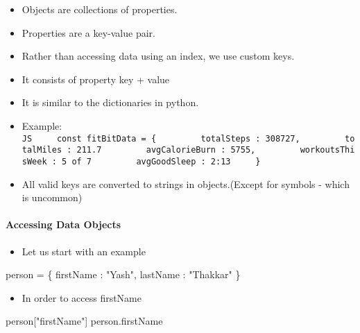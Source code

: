 \documentclass[
  paper=a4,
  ,captions=tableheading
]{scrartcl}
\newenvironment{Shaded}{}{}
\newcommand{\AttributeTok}[1]{\textcolor[rgb]{0.49,0.56,0.16}{#1}}
\newcommand{\DataTypeTok}[1]{\textcolor[rgb]{0.56,0.13,0.00}{#1}}
\newcommand{\NormalTok}[1]{#1}
\newcommand{\OperatorTok}[1]{\textcolor[rgb]{0.40,0.40,0.40}{#1}}
\newcommand{\StringTok}[1]{\textcolor[rgb]{0.25,0.44,0.63}{#1}}
\providecommand{\tightlist}{%
  \setlength{\itemsep}{0pt}\setlength{\parskip}{0pt}}
\begin{document}
\begin{itemize}
\tightlist
\item
  Objects are collections of properties.
\item
  Properties are a key-value pair.
\item
  Rather than accessing data using an index, we use custom keys.
\item
  It consists of property key + value
\item
  It is similar to the dictionaries in python.
\item
  Example:
  \texttt{JS\ \ \ \ \ const\ fitBitData\ =\ \{\ \ \ \ \ \ \ \ \ totalSteps\ :\ 308727,\ \ \ \ \ \ \ \ \ totalMiles\ :\ 211.7\ \ \ \ \ \ \ \ \ avgCalorieBurn\ :\ 5755,\ \ \ \ \ \ \ \ \ workoutsThisWeek\ :\ \textquotesingle{}5\ of\ 7\textquotesingle{}\ \ \ \ \ \ \ \ \ avgGoodSleep\ :\ \textquotesingle{}2:13\textquotesingle{}\ \ \ \ \ \}}
\item
  All valid keys are converted to strings in objects.(Except for symbols
  - which is uncommon)
\end{itemize}

\hypertarget{accessing-data-objects}{%
\paragraph{Accessing Data Objects}\label{accessing-data-objects}}

\begin{itemize}
\tightlist
\item
  Let us start with an example
\end{itemize}

\begin{Shaded}
\begin{Highlighting}[]
\NormalTok{person }\OperatorTok{=}\NormalTok{ \{}
    \DataTypeTok{firstName} \OperatorTok{:} \StringTok{"Yash"}\OperatorTok{,}
    \DataTypeTok{lastName} \OperatorTok{:} \StringTok{"Thakkar"}
\NormalTok{\}}
\end{Highlighting}
\end{Shaded}

\begin{itemize}
\tightlist
\item
  In order to access firstName
\end{itemize}

\begin{Shaded}
\begin{Highlighting}[]
\NormalTok{person[}\StringTok{"firstName"}\NormalTok{]}
\NormalTok{person}\OperatorTok{.}\AttributeTok{firstName}
\end{Highlighting}
\end{Shaded}
\end{document}
